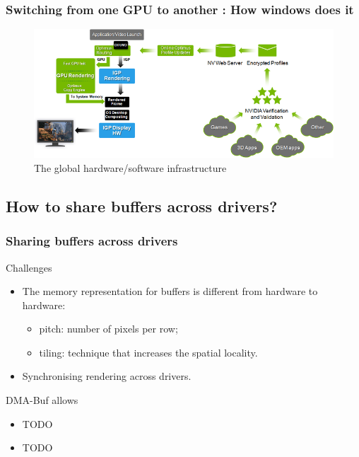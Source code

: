 \documentclass[11pt,english,compress]{beamer}
\begin{document}
\begin{frame}
	\frametitle{Switching from one GPU to another : How windows does it}

	\begin{figure}[h]
		\centering
		\includegraphics[width=1\linewidth]{imgs/optimus_arch.png}
		\caption{The global hardware/software infrastructure}
	\end{figure}
\end{frame}

\subsection{How to share buffers across drivers?}

\begin{frame}
	\frametitle{Sharing buffers across drivers}

	\begin{block}{Challenges}
		
		\begin{itemize}
			\item The memory representation for buffers is different from hardware to hardware:
			\begin{itemize}
				\item pitch: number of pixels per row;
				\item tiling: technique that increases the spatial locality.
			\end{itemize}
			\item Synchronising rendering across drivers.
		\end{itemize}
		
	\end{block}


	\begin{block}{DMA-Buf allows}
		\begin{itemize}
			\item TODO
			\item TODO
		\end{itemize}
	\end{block}
\end{frame}
\end{document}
